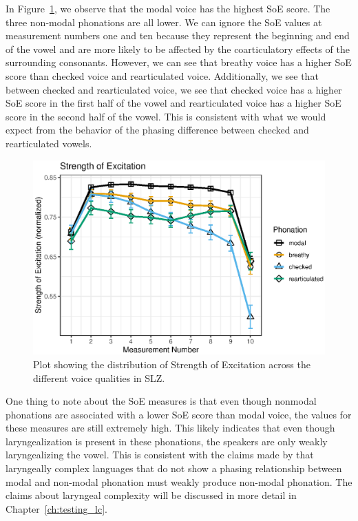 In Figure~\ref{fig:soe}, we observe that the modal voice has the highest SoE score. The three non-modal phonations are all lower. We can ignore the SoE values at measurement numbers one and ten because they represent the beginning and end of the vowel and are more likely to be affected by the coarticulatory effects of the surrounding consonants. However, we can see that breathy voice has a higher SoE score than checked voice and rearticulated voice. Additionally, we see that between checked and rearticulated voice, we see that checked voice has a higher SoE score in the first half of the vowel and rearticulated voice has a higher SoE score in the second half of the vowel. This is consistent with what we would expect from the behavior of the phasing difference between checked and rearticulated vowels. 

\begin{figure}[h!]
    \centering
    \includegraphics{images/slz_soe.eps}
    \caption{Plot showing the distribution of Strength of Excitation across the different voice qualities in SLZ.}
    \label{fig:soe}
\end{figure}

One thing to note about the SoE measures is that even though nonmodal phonations are associated with a lower SoE score than modal voice, the values for these measures are still extremely high. This likely indicates that even though laryngealization is present in these phonations, the speakers are only weakly laryngealizing the vowel. This is consistent with the claims made by \citet{silvermanLaryngealComplexityOtomanguean1997,silvermanPhasingRecoverability1997} that laryngeally complex languages that do not show a phasing relationship between modal and non-modal phonation must weakly produce non-modal phonation. The claims about laryngeal complexity will be discussed in more detail in Chapter~\ref{ch:testing_lc}.

